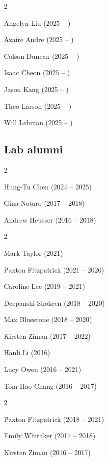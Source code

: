 \documentclass{tufte-book} %
\begin{document}
\begin{fullwidth}
\begin{multicols}{2}
\begin{list}{\quad}{}
\item Angelyn Liu (2025 -- )
\item Azaire Andre (2025 -- )
\item Colson Duncan (2025 -- )
\item Isaac Cheon (2025 -- )
\item Jason Kang (2025 -- )
\item Theo Larson (2025 -- )
\item Will Lehman (2025 -- )
\end{list}
\end{multicols}

\newpage

\subsection{Lab alumni}
\begin{multicols}{2}\raggedcolumns
\begin{list}{\quad}{}
\item Hung-Tu Chen (2024 -- 2025)
\item Gina Notaro (2017 -- 2018)
\item Andrew Heusser (2016 -- 2018)
\end{list}
\end{multicols}

\begin{multicols}{2}\raggedcolumns
  \begin{list}{\quad}{}
\item Mark Taylor (2021)
\item Paxton Fitzpatrick (2021 -- 2026)
\item Caroline Lee (2019 -- 2021)
\item Deepanshi Shokeen (2018 -- 2020)
\item Max Bluestone (2018 -- 2020)
\item Kirsten Ziman (2017 -- 2022)
\item Hanli Li (2016)
\item Lucy Owen (2016 -- 2021)
\item Tom Hao Chang (2016 -- 2017)
\end{list}
  \end{multicols}

\begin{multicols}{2}\raggedcolumns
\begin{list}{\quad}{}
\item Paxton Fitzpatrick (2018 -- 2021)
\item Emily Whitaker (2017 -- 2018)
\item Kirsten Ziman (2016 -- 2017)
\end{list}
\end{multicols}



\end{fullwidth}
\end{document}
